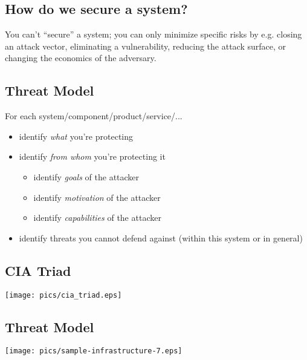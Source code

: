 \documentclass[xga]{xdvislides}
\begin{document}
\subsection{How do we secure a system?}
\vspace*{\fill}
\Huge
\begin{center}
You can't ``secure'' a system; you can only minimize
specific risks by e.g. closing an attack vector,
eliminating a vulnerability, reducing the attack
surface, or changing the economics of the adversary.
\end{center}
\Normalsize
\vspace*{\fill}


\subsection{Threat Model}
For each system/component/product/service/...

\begin{itemize}
	\item identify {\em what} you're protecting
	\item identify {\em from whom} you're protecting it
		\begin{itemize}
			\item identify {\em goals} of the attacker
			\item identify {\em motivation} of the attacker
			\item identify {\em capabilities} of the attacker
		\end{itemize}
	\item identify threats you cannot defend against (within this
		system or in general)
\end{itemize}

\subsection{CIA Triad}
\vspace*{\fill}
\begin{center}
	\texttt{[image: pics/cia\_triad.eps]} \\
\end{center}
\vspace*{\fill}

\subsection{Threat Model}
\vspace*{\fill}
\begin{center}
	\texttt{[image: pics/sample-infrastructure-7.eps]} \\
\end{center}
\vspace*{\fill}
\end{document}
